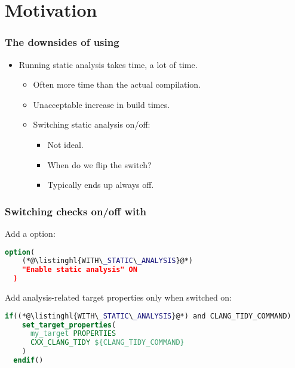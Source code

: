 \documentclass[compress,table,xcolor=table]{beamer}
\begin{document}
\section{Motivation}
\begin{frame}
  \Huge
\end{frame}
\begin{frame}
  \frametitle{The downsides of using }
    \LARGE
    \begin{itemize}
    \item Running static analysis takes time, {\larger a lot} of time.
        \Large
        \begin{itemize}
        \item Often more time than the actual compilation.
        \item Unacceptable increase in build times.
        \item Switching static analysis on/off:
            \begin{itemize}
            \item Not ideal.
            \item When do we flip the switch?
            \item Typically ends up always off.
            \end{itemize}
        \end{itemize}
    \end{itemize}
\end{frame}
\begin{frame}[fragile]
  \frametitle{Switching  checks on/off with }
  \Large
   Add a  option:
  \begin{lstlisting}[language=cmake]
  option(
    (*@\listinghl{WITH\_STATIC\_ANALYSIS}@*)
    "Enable static analysis" ON
  )
  \end{lstlisting}

  Add analysis-related target properties only when switched on:

  \begin{lstlisting}[language=cmake]
  if((*@\listinghl{WITH\_STATIC\_ANALYSIS}@*) and CLANG_TIDY_COMMAND)
    set_target_properties(
      my_target PROPERTIES
      CXX_CLANG_TIDY ${CLANG_TIDY_COMMAND}
    )
  endif()
  \end{lstlisting}

\end{frame}
\end{document}
